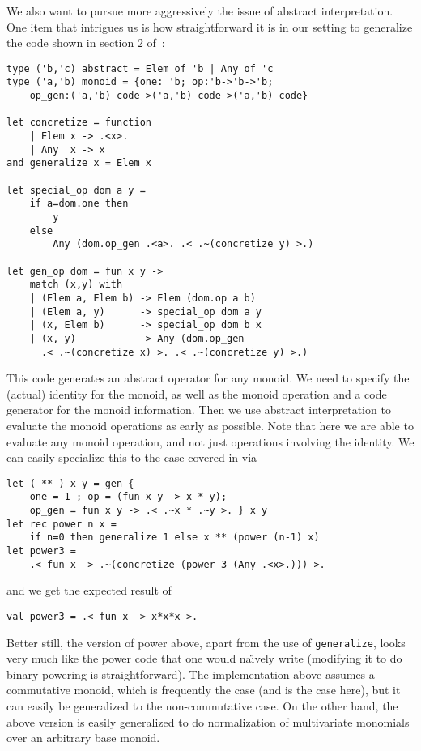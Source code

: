 \documentclass[11pt]{elsart}
\begin{document}
We also want to pursue more aggressively the issue of abstract interpretation.
One item that intrigues us is how straightforward it is in our setting
to generalize the code shown in section 2 of~\cite{KiselyovTaha}:
\begin{small}
\begin{verbatim}
type ('b,'c) abstract = Elem of 'b | Any of 'c 
type ('a,'b) monoid = {one: 'b; op:'b->'b->'b;
    op_gen:('a,'b) code->('a,'b) code->('a,'b) code}

let concretize = function 
    | Elem x -> .<x>.
    | Any  x -> x
and generalize x = Elem x

let special_op dom a y = 
    if a=dom.one then 
        y 
    else 
        Any (dom.op_gen .<a>. .< .~(concretize y) >.)

let gen_op dom = fun x y ->
    match (x,y) with
    | (Elem a, Elem b) -> Elem (dom.op a b)
    | (Elem a, y)      -> special_op dom a y
    | (x, Elem b)      -> special_op dom b x
    | (x, y)           -> Any (dom.op_gen 
      .< .~(concretize x) >. .< .~(concretize y) >.)

\end{verbatim}
\end{small}
This code generates an abstract operator for any monoid.
We need to specify the (actual) identity for the monoid, as 
well as the monoid operation and a code generator for
the monoid information.  Then we use abstract interpretation
to evaluate the monoid operations as early as possible.  Note that
here we are able to evaluate any monoid operation, and not just
operations involving the identity.  
We can easily specialize this to the case covered in
\cite{KiselyovTaha} via
\begin{small}
\begin{verbatim}
let ( ** ) x y = gen {
    one = 1 ; op = (fun x y -> x * y);
    op_gen = fun x y -> .< .~x * .~y >. } x y 
let rec power n x = 
    if n=0 then generalize 1 else x ** (power (n-1) x)
let power3 = 
    .< fun x -> .~(concretize (power 3 (Any .<x>.))) >.
\end{verbatim}
\end{small}
and we get the expected result of
\begin{small}
\begin{verbatim}
val power3 = .< fun x -> x*x*x >.
\end{verbatim}
\end{small}
Better still, the version of power above, apart from the use of
\texttt{generalize}, looks very much like the power code that one would
na\"{\i}vely write (modifying it to do binary powering is straightforward).  
The implementation above assumes a commutative monoid, which
is frequently the case (and is the case here), but it can easily be
generalized to the non-commutative case.  On the other hand, the 
above version is easily generalized to do normalization of 
multivariate monomials over an arbitrary base monoid.
\end{document}
